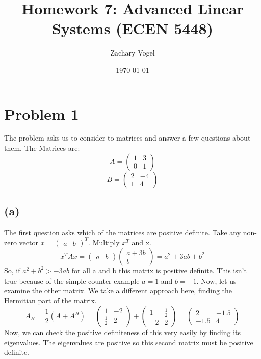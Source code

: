 \documentclass{article}
\title{Homework 7: Advanced Linear Systems (ECEN 5448)}
\author{Zachary Vogel}
\date{\today}
\begin{document}
\maketitle

\section*{Problem 1}
The problem asks us to consider to matrices and answer a few questions about them. The Matrices are:
\[A=\begin{pmatrix}1 & 3\\0 & 1\end{pmatrix}\]
\[B=\begin{pmatrix}2 & -4\\1 & 4\end{pmatrix}\]
\subsection*{(a)}
The first question asks which of the matrices are positive definite. Take any non-zero vector $x=\begin{pmatrix}a & b\end{pmatrix}^T$. Multiply $x^T$ and x.
\[x^TAx=\begin{pmatrix}a &b\end{pmatrix}\begin{pmatrix}a+3b\\b\end{pmatrix}=a^2+3ab+b^2\]
So, if $a^2+b^2>-3ab$ for all a and b this matrix is positive definite. This isn't true because of the simple counter example $a=1$ and $b=-1$.
Now, let us examine the other matrix. We take a different approach here, finding the Hermitian part of the matrix.
\[A_H=\frac{1}{2}\left(A+A^H\right )=\begin{pmatrix}1 & -2\\\frac{1}{2} & 2\end{pmatrix}+\begin{pmatrix}1 & \frac{1}{2}\\-2 &2\end{pmatrix}=\begin{pmatrix}2 &-1.5\\-1.5&4\end{pmatrix}\]
Now, we can check the positive definiteness of this very easily by finding its eigenvalues. The eigenvalues are positive so this second matrix must be positive definite.
\end{document}
